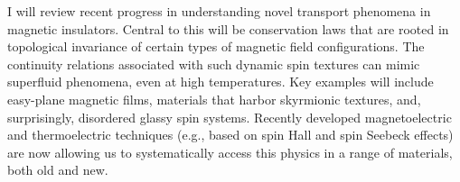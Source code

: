 I will review recent progress in understanding novel transport phenomena in magnetic insulators. Central to this will be conservation laws that are rooted in topological invariance of certain types of magnetic field configurations. The continuity relations associated with such dynamic spin textures can mimic superfluid phenomena, even at high temperatures. Key examples will include easy-plane magnetic films, materials that harbor skyrmionic textures, and, surprisingly, disordered glassy spin systems. Recently developed magnetoelectric and thermoelectric techniques (e.g., based on spin Hall and spin Seebeck effects) are now allowing us to systematically access this physics in a range of materials, both old and new.